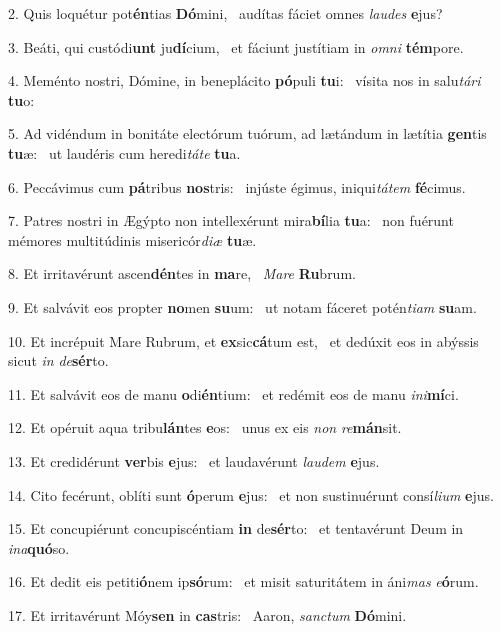 2. Quis loquétur pot\textbf{én}tias \textbf{Dó}mini, \ast\  audítas fáciet omnes \textit{lau}\textit{des} \textbf{e}jus?\

3. Beáti, qui custódi\textbf{unt} ju\textbf{dí}cium, \ast\  et fáciunt justítiam in \textit{om}\textit{ni} \textbf{tém}pore.\

4. Meménto nostri, Dómine, in beneplácito \textbf{pó}puli \textbf{tu}i: \ast\  vísita nos in salu\textit{tá}\textit{ri} \textbf{tu}o:\

5. Ad vidéndum in bonitáte electórum tuórum, ad lætándum in lætítia \textbf{gen}tis \textbf{tu}æ: \ast\  ut laudéris cum heredi\textit{tá}\textit{te} \textbf{tu}a.\

6. Peccávimus cum \textbf{pá}tribus \textbf{nos}tris: \ast\  injúste égimus, iniqui\textit{tá}\textit{tem} \textbf{fé}cimus.\

7. Patres nostri in Ægýpto non intellexérunt mira\textbf{bí}lia \textbf{tu}a: \ast\  non fuérunt mémores multitúdinis misericór\textit{di}\textit{æ} \textbf{tu}æ.\

8. Et irritavérunt ascen\textbf{dén}tes in \textbf{ma}re, \ast\  \textit{Ma}\textit{re} \textbf{Ru}brum.\

9. Et salvávit eos propter \textbf{no}men \textbf{su}um: \ast\  ut notam fáceret potén\textit{ti}\textit{am} \textbf{su}am.\

10. Et incrépuit Mare Rubrum, et \textbf{ex}sic\textbf{cá}tum est, \ast\  et dedúxit eos in abýssis sicut \textit{in} \textit{de}\textbf{sér}to.\

11. Et salvávit eos de manu \textbf{o}di\textbf{én}tium: \ast\  et redémit eos de manu \textit{in}\textit{i}\textbf{mí}ci.\

12. Et opéruit aqua tribu\textbf{lán}tes \textbf{e}os: \ast\  unus ex eis \textit{non} \textit{re}\textbf{mán}sit.\

13. Et credidérunt \textbf{ver}bis \textbf{e}jus: \ast\  et laudavérunt \textit{lau}\textit{dem} \textbf{e}jus.\

14. Cito fecérunt, oblíti sunt \textbf{ó}perum \textbf{e}jus: \ast\  et non sustinuérunt consí\textit{li}\textit{um} \textbf{e}jus.\

15. Et concupiérunt concupiscéntiam \textbf{in} de\textbf{sér}to: \ast\  et tentavérunt Deum in \textit{in}\textit{a}\textbf{quó}so.\

16. Et dedit eis petiti\textbf{ó}nem ip\textbf{só}rum: \ast\  et misit saturitátem in áni\textit{mas} \textit{e}\textbf{ó}rum.\

17. Et irritavérunt Móy\textbf{sen} in \textbf{cas}tris: \ast\  Aaron, \textit{sanc}\textit{tum} \textbf{Dó}mini.\

